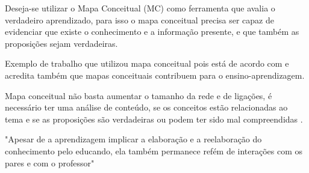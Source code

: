 Deseja-se utilizar o Mapa Conceitual (MC) como ferramenta que avalia o verdadeiro aprendizado, para isso o mapa conceitual precisa ser capaz de evidenciar que existe o conhecimento e a informação presente, e que também as proposições sejam verdadeiras.

Exemplo de trabalho que utilizou mapa conceitual \cite{leiDeNewtonMC} pois está de acordo com \cite{novak} e acredita também que mapas conceituais contribuem para o ensino-aprendizagem.

Mapa conceitual não basta aumentar o tamanho da rede e de ligações, é necessário ter uma análise de conteúdo, se os conceitos estão relacionadas ao tema e se as proposições são verdadeiras ou podem ter sido mal compreendidas \cite{vantagensDesvantagensMC}.

"Apesar de a aprendizagem implicar a elaboração e a reelaboração do conhecimento pelo educando, ela também permanece refém de interações com os pares e com o professor" \cite[p. 180]{vantagensDesvantagensMC}

\begin{comment}
Existem estudos com referencial teórico apoiando o uso de gamificação em vários contextos e utilizando dos benefícios oferecidos por ela. Exemplo de contextos como marketing, saúde, educação e etc. A gamificação é também utilizada em contextos de ensino de matemática (embora não sejam muitos os resultados encontrados para universidades). Em alguns casos são utilizados a tecnologia junto da gamificação nos contextos acima citado. É dito que a tecnologia e jogos contribuem para ajudar no engajamento e chamar atenção das pessoas e dos estudantes.
Tem um estudo dizendo que não há limites para a idade de jogar, brincar e se divertir. Por isso jogo e gamificação podem ser possíveis estratégias para utilizar em comunhão de tecnologias visando o ensino de EDO 1ª ordem para estudantes do ensino superior.
 
 \end{comment}
